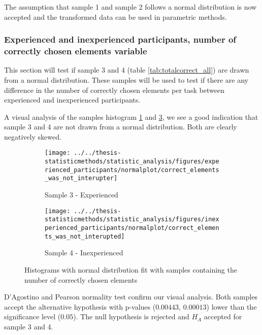 The assumption that sample 1 and sample 2 follows a normal distribution is now accepted and the transformed data can be used in parametric methods.

\subsubsection[Sample 3 and 4]{Experienced and inexperienced participants, number of correctly chosen elements variable}\label{sec:correct_ex_inex}
This section will test if sample 3 and 4 (table \ref{tab:totalcorrect_all}) are drawn from a normal distribution. These samples will be used to test if there are any difference in the number of correctly chosen elements per task between experienced and inexperienced participants. 

A visual analysis of the samples histogram \ref{fig:correctelementswasnotinterupter_ex} and \ref{fig:correctelementswasnotinterupted_inex}, we see a good indication that sample 3 and 4 are not drawn from a normal distribution. Both are clearly negatively skewed. 

\begin{figure}[h!]
	\centering
	\begin{subfigure}[b]{0.48\textwidth}
		\centering
		\texttt{[image: ../../thesis-statisticmethods/statistic\_analysis/figures/experienced\_participants/normalplot/correct\_elements\_was\_not\_interupter]}
		\caption{Sample 3 - Experienced}
		\label{fig:correctelementswasnotinterupter_ex}
	\end{subfigure}
	\begin{subfigure}[b]{0.48\textwidth}
		\centering
		\texttt{[image: ../../thesis-statisticmethods/statistic\_analysis/figures/inexperienced\_participants/normalplot/correct\_elements\_was\_not\_interupted]}
		\caption{Sample 4 - Inexperienced}
		\label{fig:correctelementswasnotinterupted_inex}
	\end{subfigure}
	\caption{Histograms with normal distribution fit with samples containing the number of correctly chosen elements}
\end{figure}

D'Agostino and Pearson normality test confirm our visual analysis. Both samples accept the alternative hypothesis with p-values ($0.00443$, $0.00013$) lower than the significance level ($0.05$). The null hypothesis is rejected and $H_A$ accepted for sample 3 and 4.


